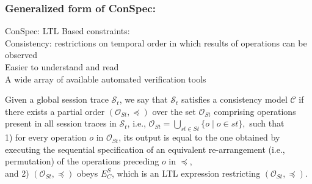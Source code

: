 \documentclass{beamer}
\begin{document}
\begin{frame}
\frametitle{Generalized form of ConSpec:}
ConSpec: LTL Based constraints: \\
Consistency: restrictions on temporal order in which results of operations can be observed\\
Easier to understand and read \\
A wide array of available automated verification tools
	\begin{definition}{}\label{def:form0}
	Given a global session trace $\mathcal{S}_t$,
	we say  that $\mathcal{S}_t$ satisfies a consistency model $\mathcal{C}$
	if there exists a partial order $\left( {\mathcal{O}_{St}}, \preccurlyeq \right)$ over the set ${\mathcal{O}_{St}}$ comprising operations  present in all session traces in $\mathcal{S}_t$, i.e.,  ${\mathcal{O}_{St}} = \bigcup_{st \in St} \{ o \mid o \in st \},$
	such that \\
	1) for every operation $\mathit{o}$ in  ${\mathcal{O}_{St}}$, %
	its output is equal to the one obtained by executing the sequential specification of an  equivalent re-arrangement (i.e., permutation) %
	of the operations preceding $\mathit{o}$ in $\preccurlyeq$, \\
	and 2) $\left( {\mathcal{O}_{St}}, \preccurlyeq \right)$ obeys $E^S_C$, which is an LTL expression restricting $\left( {\mathcal{O}_{St}}, \preccurlyeq \right)$.
\end{definition}
\end{frame}
\end{document}
